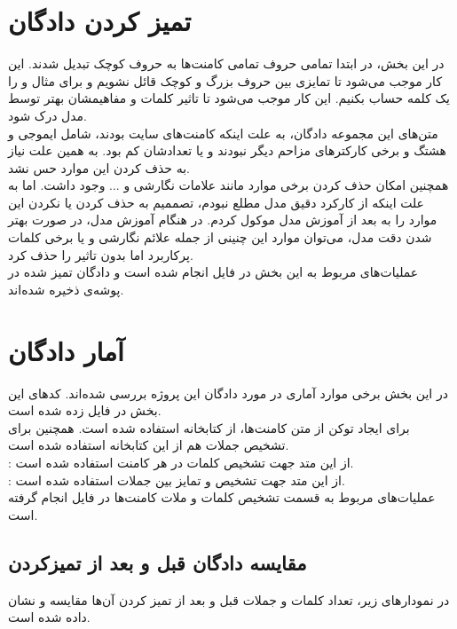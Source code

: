 \section{تمیز کردن دادگان}
\par
در این بخش، در ابتدا تمامی حروف تمامی کامنت‌ها به حروف کوچک تبدیل شدند. این کار موجب می‌شود تا تمایزی بین حروف بزرگ و کوچک قائل نشویم و برای مثال  و  را یک کلمه حساب بکنیم. این کار موجب می‌شود تا تاثیر کلمات و مفاهیمشان بهتر توسط مدل درک شود. \\
متن‌های این مجموعه دادگان، به علت اینکه کامنت‌های سایت  بودند، شامل ایموجی و هشتگ و برخی کارکترهای مزاحم دیگر نبودند و یا تعدادشان کم بود. به همین علت نیاز به حذف کردن این موارد حس نشد. \\
همچنین امکان حذف کردن برخی موارد مانند علامات نگارشی و ... وجود داشت. اما به علت اینکه از کارکرد دقیق مدل مطلع نبودم، تصممیم به حذف کردن یا نکردن این موارد را به بعد از آموزش مدل موکول کردم. در هنگام آموزش مدل، در صورت بهتر شدن دقت مدل، می‌توان موارد این چنینی از جمله علائم نگارشی و یا برخی کلمات پرکاربرد اما بدون تاثیر را حذف کرد. \\
عملیات‌های مربوط به این بخش در فایل  انجام شده است و دادگان تمیز شده در پوشه‌ی  ذخیره شده‌اند.

\section{آمار دادگان}
\par
در این بخش برخی موارد آماری در مورد دادگان این پروژه بررسی شده‌اند. کدهای این بخش در فایل  زده شده است. \\
برای ایجاد توکن از متن کامنت‌ها، از کتابخانه  استفاده شده است. همچنین برای تشخیص جملات هم از این کتابخانه استفاده شده است. \\
: از این متد جهت تشخیص کلمات در هر کامنت استفاده شده است.\\
: از این متد جهت تشخیص و تمایز بین جملات استفاده شده است. \\
عملیات‌های مربوط به قسمت تشخیص کلمات و ملات کامنت‌ها در فایل  انجام گرفته است.

\subsection{مقایسه دادگان قبل و بعد از تمیزکردن } 
\par
در نمودارهای زیر، تعداد کلمات و جملات قبل و بعد از تمیز کردن آن‌ها مقایسه و نشان داده شده است.

